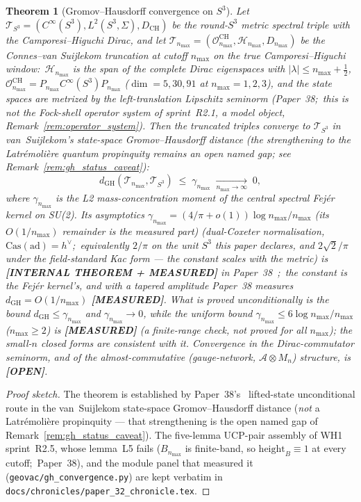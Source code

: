 \documentclass[11pt]{article}
\newtheorem{theorem}{Theorem}
\begin{document}
\begin{theorem}[Gromov--Hausdorff convergence on $S^3$]
\label{thm:gh_convergence}
Let $\mathcal{T}_{S^3} = (C^\infty(S^3), L^2(S^3, \Sigma), D_{\mathrm{CH}})$
be the round-$S^3$ metric spectral triple with the Camporesi--Higuchi
Dirac, and let $\mathcal{T}_{n_{\max}} = (\mathcal{O}^{\mathrm{CH}}_{n_{\max}},
\mathcal{H}_{n_{\max}}, D_{n_{\max}})$ be the Connes--van Suijlekom
truncation at cutoff $n_{\max}$ on the \emph{true} Camporesi--Higuchi
window:\ $\mathcal{H}_{n_{\max}}$ is the span of the complete Dirac
eigenspaces with $|\lambda| \le n_{\max} + \tfrac12$,
$\mathcal{O}^{\mathrm{CH}}_{n_{\max}} = P_{n_{\max}} C^\infty(S^3) P_{n_{\max}}$
($\dim = 5, 30, 91$ at $n_{\max} = 1, 2, 3$), and the state spaces are
metrized by the left-translation Lipschitz seminorm (Paper~38;\ this is
\emph{not} the Fock-shell operator system of sprint~R2.1, a model object,
Remark~\ref{rem:operator_system}).  Then the truncated triples converge to $\mathcal{T}_{S^3}$
in van~Suijlekom's state-space Gromov--Hausdorff distance (the
strengthening to the Latr{\'e}moli{\`e}re quantum propinquity remains an
open named gap; see Remark~\ref{rem:gh_status_caveat}):
$$
   d_{\mathrm{GH}}(\mathcal{T}_{n_{\max}}, \mathcal{T}_{S^3})
   \;\le\; \gamma_{n_{\max}}
   \;\xrightarrow[n_{\max}\to\infty]{}\; 0,
$$
where
$\gamma_{n_{\max}}$ is the L2 mass-concentration moment of the central
spectral Fej{\'e}r kernel on SU(2).  Its asymptotics
$\gamma_{n_{\max}} = (4/\pi + o(1))\log n_{\max}/n_{\max}$ (its $O(1/n_{\max})$ remainder is the measured part) (dual-Coxeter normalisation, $\mathrm{Cas}(\mathrm{ad}) = h^\vee$;\ equivalently $2/\pi$ on the unit $S^3$ this paper declares, and $2\sqrt2/\pi$ under the field-standard Kac form --- the constant scales with the metric)
is \textbf{[INTERNAL THEOREM + MEASURED]} in
Paper~38~\cite{loutey_paper38};\ the constant is the Fej\'er kernel's,
and with a tapered amplitude Paper~38 measures $d_{\mathrm{GH}} =
O(1/n_{\max})$ \textbf{[MEASURED]}.  What is proved
unconditionally is the bound $d_{\mathrm{GH}} \le \gamma_{n_{\max}}$ and
$\gamma_{n_{\max}} \to 0$, while the uniform bound $\gamma_{n_{\max}} \le
6\log n_{\max}/n_{\max}$ ($n_{\max} \ge 2$) is \textbf{[MEASURED]} (a finite-range check, not proved for all $n_{\max}$);
the small-$n$ closed forms are consistent with it.  Convergence in the
Dirac-commutator seminorm, and of the almost-commutative
(gauge-network, $\mathcal{A} \otimes M_n$) structure, is
\textbf{[OPEN]}.
\end{theorem}

\begin{proof}[Proof sketch]
The theorem is established by Paper~38's~\cite{loutey_paper38}
lifted-state unconditional route in the van~Suijlekom state-space
Gromov--Hausdorff distance (\emph{not} a Latr{\'e}moli{\`e}re
propinquity --- that strengthening is the open named gap of
Remark~\ref{rem:gh_status_caveat}). The five-lemma UCP-pair
assembly of WH1 sprint~R2.5, whose lemma~L5 fails
($B_{n_{\max}}$ is finite-band, so
$\mathrm{height}_B \equiv 1$ at every cutoff;\ Paper~38), and the module
panel that measured it (\texttt{geovac/gh\_convergence.py}) are kept
verbatim in \texttt{docs/chronicles/paper\_32\_chronicle.tex}.
\end{proof}
\end{document}
